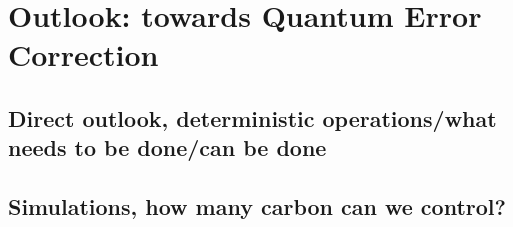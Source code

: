 \chapter{Outlook: towards Quantum Error Correction}


\section{Direct outlook, deterministic operations/what needs to be done/can be done}

\section{Simulations, how many carbon can we control? }
